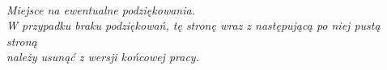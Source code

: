 \documentclass[12pt,a4paper,twoside]{report}
\theoremstyle{definition} %
\begin{document}
%
%
%
%

    
    \linespread{1.3}
    \newpage 


    \thispagestyle{empty} %
    ~\vfill
	\newpage
    
\vspace*{16cm}
\thispagestyle{empty}
\begin{flushright}
\textit{Miejsce na ewentualne podziękowania.\\
W przypadku braku podziękowań, tę stronę wraz z następującą po niej pustą stroną\\
należy usunąć z wersji końcowej pracy.}%
\end{flushright}
\newpage


\thispagestyle{empty}
~\vfill
\newpage
\end{document}
